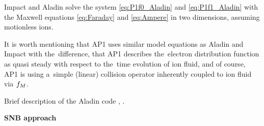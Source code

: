 Impact and Aladin solve the system \eqref{eq:P1f0_Aladin} 
and \eqref{eq:P1f1_Aladin} with the Maxwell equations  
\eqref{eq:Faraday} and \eqref{eq:Ampere} in two dimensions, 
assuming motionless ions.

It is worth mentioning that AP1 uses similar model equations as Aladin
and Impact with the~difference, that AP1 describes the~electron distribution 
function as quasi steady with respect to the~time evolution of ion fluid,
and of course, AP1 is using a~simple (linear) collision operator inherently
coupled to ion fluid via $f_M$.

Brief description of the Aladin code , .


\textbf{SNB approach}

